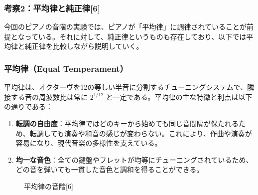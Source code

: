 \documentclass{article}
\begin{document}
\subsubsection{考察2：平均律と純正律[6]}
    \begin{spacing}{1.2}
        今回のピアノの音階の実験では、ピアノが「平均律」に調律されていることが前提となっている。それに対して、純正律というものも存在しており、以下では平均律と純正律を比較しながら説明していく。
        \subsubsection*{平均律（Equal Temperament）}
        平均律は、オクターヴを12の等しい半音に分割するチューニングシステムで、隣接する音の周波数比は常に \(2^{1/12}\) と一定である。平均律の主な特徴と利点は以下の通りである：
        \begin{enumerate}[label=\arabic*), before=\begin{spacing}{1.2}, after=\end{spacing}] %
            \item \textbf{転調の自由度}：平均律ではどのキーから始めても同じ音間隔が保たれるため、転調しても演奏や和音の感じが変わらない。これにより、作曲や演奏が容易になり、現代音楽の多様性を支えている。
            \item \textbf{均一な音色}：全ての鍵盤やフレットが均等にチューニングされているため、どの音を弾いても一貫した音色と調和を得ることができる。
        \end{enumerate}
        \begin{figure}[ht] %
            \centering
            \caption{平均律の音階[6]}
        \end{figure}
        \FloatBarrier

\end{spacing}
\end{document}
